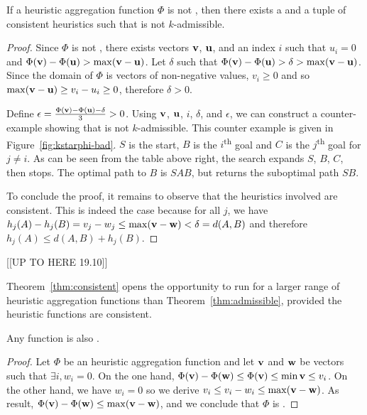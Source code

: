 \begin{theorem}
  \label{thm:consistent-dual}
  If a heuristic aggregation function $\Phi$ is not \axiomcons, then there exists a \kgs and a tuple of consistent heuristics such that \kastarphi is not $k$-admissible.
\end{theorem}
\begin{proof}
Since $\Phi$ is not \axiomcons, there exists vectors $\mathbf{v}$, $\mathbf{u}$, and an index $i$ such that $u_i = 0$ and $\Phi(\mathbf{v}) - \Phi(\mathbf{u}) > \max (\mathbf{v} - \mathbf{u})$. 
  Let $\delta$ such that $\Phi(\mathbf{v}) - \Phi(\mathbf{u}) > \delta > \max (\mathbf{v} - \mathbf{u})$.
Since the domain of $\Phi$ is vectors of non-negative values, $v_i \geq 0$ and so $\max (\mathbf{v} - \mathbf{u}) \geq v_i - u_i \geq 0$, therefore $\delta > 0$.


  Define $\epsilon = \frac{\Phi(\mathbf{v}) - \Phi(\mathbf{u}) - \delta}{3} > 0$.
  Using $\mathbf{v}$, $\mathbf{u}$, $i$, $\delta$, and $\epsilon$, we can construct a counter-example showing that \kastarphi is not $k$-admissible. 
  This counter example is given in Figure~\ref{fig:kstarphi-bad}. 
$S$ is the start, $B$ is the $i$\textsuperscript{th} goal and $C$ is the $j$\textsuperscript{th} goal for $j \neq i$. 
     As can be seen from the table above right, the search expands $S$, $B$, $C$, then stops. 
     The optimal path to $B$ is $SAB$, but \kastarphi returns the suboptimal path $SB$. 

  To conclude the proof, it remains to observe that the heuristics involved are consistent.
  This is indeed the case because for all $j$, we have $h_j(A) - h_j(B) = v_j - w_j \leq \max (\mathbf{v} - \mathbf{w}) < \delta = d(A, B)$ and therefore $h_j(A) \leq d(A, B) + h_j(B)$.
\end{proof}

[[UP TO HERE 19.10]]

Theorem~\ref{thm:consistent} opens the opportunity to run \kastar for a larger range of heuristic aggregation functions than Theorem~\ref{thm:admissible}, provided the heuristic functions are consistent.

\begin{observation}
  Any \axiomadm function is also \axiomcons.
\end{observation}
\begin{proof}
  Let $\Phi$ be an \axiomadm heuristic aggregation function and let $\mathbf{v}$ and $\mathbf{w}$ be vectors such that $\exists i, w_i = 0$.
  On the one hand, $\Phi(\mathbf{v}) - \Phi(\mathbf{w}) \leq \Phi(\mathbf{v}) \leq \min \mathbf{v} \leq v_i$.
  On the other hand, we have $w_i = 0$ so we derive $v_i \leq v_i - w_i \leq \max (\mathbf{v} - \mathbf{w})$.
  As result, $\Phi(\mathbf{v}) - \Phi(\mathbf{w}) \leq \max (\mathbf{v} - \mathbf{w})$, and we conclude that $\Phi$ is \axiomcons.
\end{proof}

